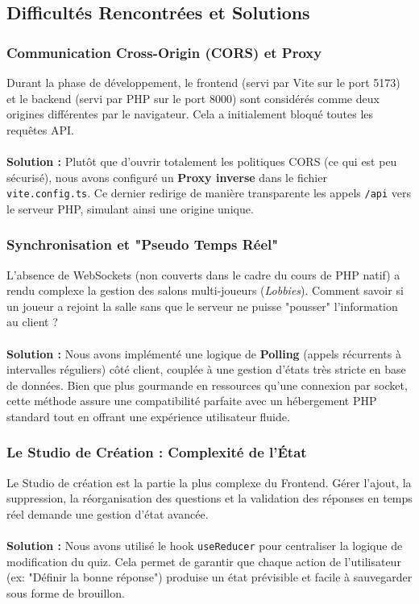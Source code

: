 \documentclass[12pt,a4paper]{article}
\begin{document}
\subsection{Difficultés Rencontrées et Solutions}

\subsubsection{Communication Cross-Origin (CORS) et Proxy}
Durant la phase de développement, le frontend (servi par Vite sur le port 5173) et le backend (servi par PHP sur le port 8000) sont considérés comme deux origines différentes par le navigateur. Cela a initialement bloqué toutes les requêtes API. 
\\
\\
\textbf{Solution :} Plutôt que d'ouvrir totalement les politiques CORS (ce qui est peu sécurisé), nous avons configuré un \textbf{Proxy inverse} dans le fichier \texttt{vite.config.ts}. Ce dernier redirige de manière transparente les appels \texttt{/api} vers le serveur PHP, simulant ainsi une origine unique.

\subsubsection{Synchronisation et "Pseudo Temps Réel"}
L'absence de WebSockets (non couverts dans le cadre du cours de PHP natif) a rendu complexe la gestion des salons multi-joueurs (\textit{Lobbies}). Comment savoir si un joueur a rejoint la salle sans que le serveur ne puisse "pousser" l'information au client ?
\\
\\
\textbf{Solution :} Nous avons implémenté une logique de \textbf{Polling} (appels récurrents à intervalles réguliers) côté client, couplée à une gestion d'états très stricte en base de données. Bien que plus gourmande en ressources qu'une connexion par socket, cette méthode assure une compatibilité parfaite avec un hébergement PHP standard tout en offrant une expérience utilisateur fluide.

\subsubsection{Le Studio de Création : Complexité de l'État}
Le Studio de création est la partie la plus complexe du Frontend. Gérer l'ajout, la suppression, la réorganisation des questions et la validation des réponses en temps réel demande une gestion d'état avancée.
\\
\\
\textbf{Solution :} Nous avons utilisé le hook \texttt{useReducer} pour centraliser la logique de modification du quiz. Cela permet de garantir que chaque action de l'utilisateur (ex: "Définir la bonne réponse") produise un état prévisible et facile à sauvegarder sous forme de brouillon.
\end{document}
